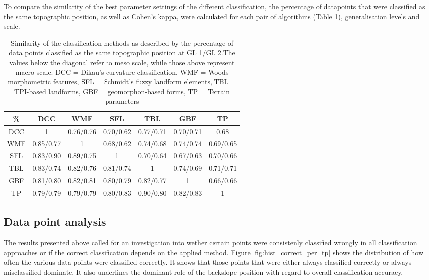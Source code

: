 \documentclass[final,1p,times,twocolumn,authoryear]{elsarticle}
\begin{document}
To compare the similarity of the best parameter settings of the different classification, the percentage of datapoints that were classified as the same topographic position, as well as Cohen's kappa, were calculated for each pair of algorithms (Table \ref{table:similarity_matrix}), generalisation levels and scale. 
\begin{table}[ht]
\caption{Similarity of the classification methods as described by the percentage of data points classified as the same topographic position at GL 1/GL 2.The values below the diagonal refer to meso scale, while those above represent macro scale. DCC = Dikau's curvature classification, WMF = Woods morphometric features, SFL = Schmidt's fuzzy landform elements, TBL = TPI-based landforms, GBF = geomorphon-based forms, TP = Terrain parameters}
\centering
\begin{tabular}{ccccccc}
  \hline
\%  & DCC & WMF &SFL &TBL & GBF & TP \\ 
  \hline
DCC &1 & 0.76/0.76 & 0.70/0.62 & 0.77/0.71 & 0.70/0.71 & 0.68 \\ 
WMF &0.85/0.77  & 1 & 0.68/0.62 & 0.74/0.68 & 0.74/0.74 & 0.69/0.65 \\ 
SFL & 0.83/0.90 & 0.89/0.75 & 1 & 0.70/0.64 & 0.67/0.63 & 0.70/0.66 \\ 
TBL & 0.83/0.74 &0.82/0.76  &0.81/0.74  & 1 & 0.74/0.69 & 0.71/0.71 \\ 
GBF &0.81/0.80  &0.82/0.81  & 0.80/0.79  & 0.82/0.77 & 1 & 0.66/0.66 \\ 
TP &0.79/0.79  &0.79/0.79  &0.80/0.83  &0.90/0.80  &0.82/0.83  & 1 \\ 
   \hline
\end{tabular}
\label{table:similarity_matrix}
\end{table}



\subsection{Data point analysis} 
The results presented above called for an investigation into wether certain points were consistenly classified wrongly in all classification approaches or if the correct classification depends on the applied method. Figure \ref{fig:hist_correct_per_tp} shows the distribution of how often the various data points were classified correctly. It shows that those points that were either always classified correctly or always misclassified dominate. It also underlines the dominant role of the backslope position with regard to overall classification accuracy.
\end{document}
